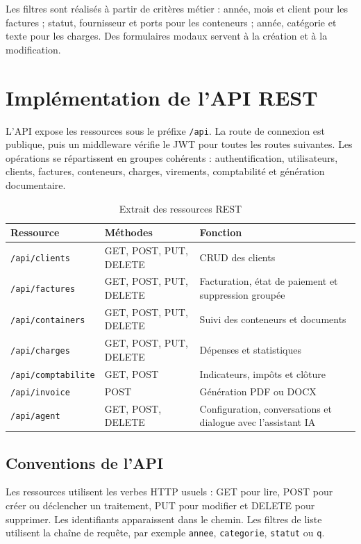 \documentclass[12pt,a4paper,oneside]{report}
\newcommand{\code}[1]{\texttt{#1}}
\begin{document}
Les filtres sont réalisés à partir de critères métier : année, mois et client pour les factures ; statut, fournisseur et ports pour les conteneurs ; année, catégorie et texte pour les charges. Des formulaires modaux servent à la création et à la modification.

\section{Implémentation de l'API REST}
L'API expose les ressources sous le préfixe \code{/api}. La route de connexion est publique, puis un middleware vérifie le JWT pour toutes les routes suivantes. Les opérations se répartissent en groupes cohérents : authentification, utilisateurs, clients, factures, conteneurs, charges, virements, comptabilité et génération documentaire.

\begin{table}[H]\centering
\caption{Extrait des ressources REST}
\begin{tabularx}{\textwidth}{p{3.2cm}p{3.5cm}Y}
\toprule \textbf{Ressource} & \textbf{Méthodes} & \textbf{Fonction}\\ \midrule
\code{/api/clients} & GET, POST, PUT, DELETE & CRUD des clients\\
\code{/api/factures} & GET, POST, PUT, DELETE & Facturation, état de paiement et suppression groupée\\
\code{/api/containers} & GET, POST, PUT, DELETE & Suivi des conteneurs et documents\\
\code{/api/charges} & GET, POST, PUT, DELETE & Dépenses et statistiques\\
\code{/api/comptabilite} & GET, POST & Indicateurs, impôts et clôture\\
\code{/api/invoice} & POST & Génération PDF ou DOCX\\
\code{/api/agent} & GET, POST, DELETE & Configuration, conversations et dialogue avec l'assistant IA\\
\bottomrule
\end{tabularx}
\end{table}

\subsection{Conventions de l'API}
Les ressources utilisent les verbes HTTP usuels : GET pour lire, POST pour créer ou déclencher un traitement, PUT pour modifier et DELETE pour supprimer. Les identifiants apparaissent dans le chemin. Les filtres de liste utilisent la chaîne de requête, par exemple \code{annee}, \code{categorie}, \code{statut} ou \code{q}.
\end{document}
